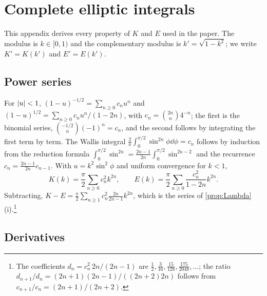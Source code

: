 \section{Complete elliptic integrals}\label{app:elliptic}

This appendix derives every property of $K$ and $E$ used in the paper. The
modulus is $k\in[0,1)$ and the complementary modulus is $k'=\sqrt{1-k^2}$;
we write $K'=K(k')$ and $E'=E(k')$.

\subsection{Power series}

For $\left|u\right|<1$, $(1-u)^{-1/2}=\sum_{n\ge0}c_nu^n$ and
$(1-u)^{1/2}=\sum_{n\ge0}c_nu^n/(1-2n)$, with $c_n=\binom{2n}n4^{-n}$; the
first is the binomial series, $\binom{-1/2}n(-1)^n=c_n$, and the second follows
by integrating the first term by term. The Wallis integral
$\frac2\pi\int_0^{\pi/2}\sin^{2n}\phi\dd\phi=c_n$ follows by induction from
the reduction formula
$\int_0^{\pi/2}\sin^{2n}=\frac{2n-1}{2n}\int_0^{\pi/2}\sin^{2n-2}$ and the
recurrence $c_n=\frac{2n-1}{2n}c_{n-1}$. With $u=k^2\sin^2\phi$ and uniform
convergence for $k<1$,
\begin{equation}\label{eq:KEseries}
K(k)=\frac\pi2\sum_{n\ge0}c_n^2k^{2n},\qquad
E(k)=\frac\pi2\sum_{n\ge0}\frac{c_n^2}{1-2n}k^{2n}.
\end{equation}
Subtracting, $K-E=\frac\pi2\sum_{n\ge1}c_n^2\frac{2n}{2n-1}k^{2n}$, which is
the series of \cref{prop:Lambda}(i).\footnote{The coefficients
$d_n=c_n^2\,2n/(2n-1)$ are $\frac12,\frac3{16},\frac{15}{128},\frac{175}{2048},
\dots$; the ratio $d_{n+1}/d_n=(2n+1)(2n-1)/((2n+2)2n)$ follows from
$c_{n+1}/c_n=(2n+1)/(2n+2)$.}

\subsection{Derivatives}

